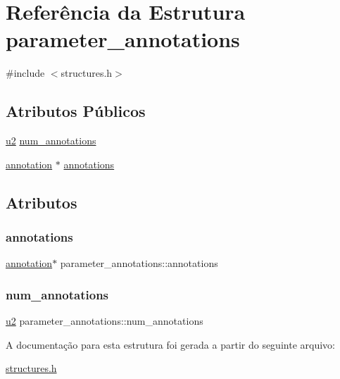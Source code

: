 \hypertarget{structparameter__annotations}{}\section{Referência da Estrutura parameter\+\_\+annotations}
\label{structparameter__annotations}


{\ttfamily \#include $<$structures.\+h$>$}

\subsection*{Atributos Públicos}
\begin{DoxyCompactItemize}
\item 
\hyperlink{lista__operandos_8h_a732cde1300aafb73b0ea6c2558a7a54f}{u2} \hyperlink{structparameter__annotations_a7e5f9ee8189799d0424e291025d3c3fd}{num\+\_\+annotations}
\item 
\hyperlink{structannotation}{annotation} $\ast$ \hyperlink{structparameter__annotations_a89a4aee9ee71512a1f33395506db9d60}{annotations}
\end{DoxyCompactItemize}


\subsection{Atributos}
\mbox{\label{structparameter__annotations_a89a4aee9ee71512a1f33395506db9d60}} 
\subsubsection{\texorpdfstring{annotations}{annotations}}
{\footnotesize\ttfamily \hyperlink{structannotation}{annotation}$\ast$ parameter\+\_\+annotations\+::annotations}

\mbox{\label{structparameter__annotations_a7e5f9ee8189799d0424e291025d3c3fd}} 
\subsubsection{\texorpdfstring{num\+\_\+annotations}{num\_annotations}}
{\footnotesize\ttfamily \hyperlink{lista__operandos_8h_a732cde1300aafb73b0ea6c2558a7a54f}{u2} parameter\+\_\+annotations\+::num\+\_\+annotations}



A documentação para esta estrutura foi gerada a partir do seguinte arquivo\+:\begin{DoxyCompactItemize}
\item 
\hyperlink{structures_8h}{structures.\+h}\end{DoxyCompactItemize}
